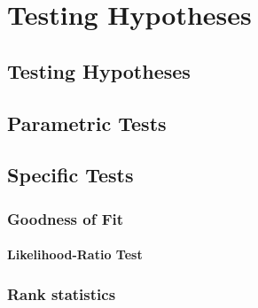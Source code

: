 \chapter{Testing Hypotheses}

\section{Testing Hypotheses}

\section{Parametric Tests}

\section{Specific Tests}

\subsection{Goodness of Fit}

\subsubsection{Likelihood-Ratio Test}

\subsection{Rank statistics}
